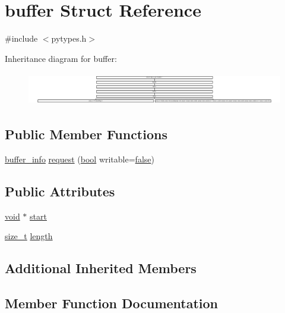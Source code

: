 \hypertarget{classbuffer}{}\section{buffer Struct Reference}
\label{classbuffer}


{\ttfamily \#include $<$pytypes.\+h$>$}

Inheritance diagram for buffer\+:\begin{figure}[H]
\begin{center}
\leavevmode
\includegraphics[height=1.452031cm]{classbuffer}
\end{center}
\end{figure}
\subsection*{Public Member Functions}
\begin{DoxyCompactItemize}
\item 
\mbox{\hyperlink{structbuffer__info}{buffer\+\_\+info}} \mbox{\hyperlink{classbuffer_ae230c88bb40d2ea306a63830d1126975}{request}} (\mbox{\hyperlink{asdl_8h_af6a258d8f3ee5206d682d799316314b1}{bool}} writable=\mbox{\hyperlink{asdl_8h_af6a258d8f3ee5206d682d799316314b1ae9de385ef6fe9bf3360d1038396b884c}{false}})
\end{DoxyCompactItemize}
\subsection*{Public Attributes}
\begin{DoxyCompactItemize}
\item 
\mbox{\hyperlink{_s_d_l__opengles2__gl2ext_8h_ae5d8fa23ad07c48bb609509eae494c95}{void}} $\ast$ \mbox{\hyperlink{classbuffer_a8be3721dc0863d9dd7460504bbaeb0d1}{start}}
\item 
\mbox{\hyperlink{detail_2common_8h_a801d6a451a01953ef8cbae6feb6a3638}{size\+\_\+t}} \mbox{\hyperlink{classbuffer_a4f467cc251f2f4504d484913c7da47bd}{length}}
\end{DoxyCompactItemize}
\subsection*{Additional Inherited Members}


\subsection{Member Function Documentation}
\mbox{\label{classbuffer_ae230c88bb40d2ea306a63830d1126975}} 
